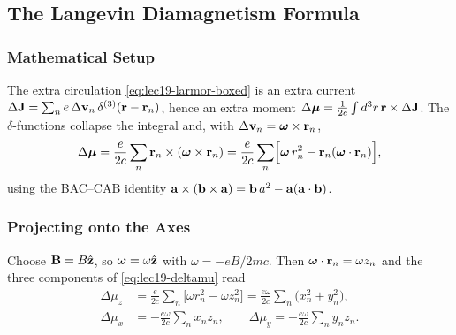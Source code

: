 \subsection{The Langevin Diamagnetism Formula}\label{subsec:lec19-langevin-dia}

\subsubsection*{Mathematical Setup}
The extra circulation \eqref{eq:lec19-larmor-boxed} is an extra current
$\Delta\mathbf{J}=\sum_n e\,\Delta\mathbf{v}_n\,\delta^{(3)}(\mathbf{r}-\mathbf{r}_n)$, hence an extra moment
$\Delta\boldsymbol{\mu}=\tfrac{1}{2c}\int d^3r\,\mathbf{r}\times\Delta\mathbf{J}$. The $\delta$-functions collapse
the integral and, with $\Delta\mathbf{v}_n=\boldsymbol{\omega}\times\mathbf{r}_n$,
\begin{equation}\label{eq:lec19-deltamu}
  \Delta\boldsymbol{\mu}=\frac{e}{2c}\sum_n \mathbf{r}_n\times(\boldsymbol{\omega}\times\mathbf{r}_n)
  =\frac{e}{2c}\sum_n\Bigl[\boldsymbol{\omega}\,r_n^2-\mathbf{r}_n(\boldsymbol{\omega}\cdot\mathbf{r}_n)\Bigr],
\end{equation}
using the BAC--CAB identity $\mathbf{a}\times(\mathbf{b}\times\mathbf{a})=\mathbf{b}\,a^2-\mathbf{a}(\mathbf{a}\cdot\mathbf{b})$.

\subsubsection*{Projecting onto the Axes}
Choose $\mathbf{B}=B\hat{\mathbf{z}}$, so $\boldsymbol{\omega}=\omega\hat{\mathbf{z}}$ with $\omega=-eB/2m c$.
Then $\boldsymbol{\omega}\cdot\mathbf{r}_n=\omega z_n$ and the three components of
\eqref{eq:lec19-deltamu} read
\begin{align}
  \Delta\mu_z &=\frac{e}{2c}\sum_n\bigl[\omega r_n^2-\omega z_n^2\bigr]
              =\frac{e\omega}{2c}\sum_n\bigl(x_n^2+y_n^2\bigr),\label{eq:lec19-muz}\\
  \Delta\mu_x &=-\frac{e\omega}{2c}\sum_n x_n z_n,\qquad
  \Delta\mu_y =-\frac{e\omega}{2c}\sum_n y_n z_n.\label{eq:lec19-muxy}
\end{align}


